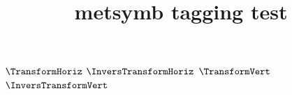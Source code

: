 \documentclass{article}
\title{metsymb tagging test}
\begin{document}
$\TransformHoriz$
$\InversTransformHoriz$
$\TransformVert$
$\InversTransformVert$
\end{document}

